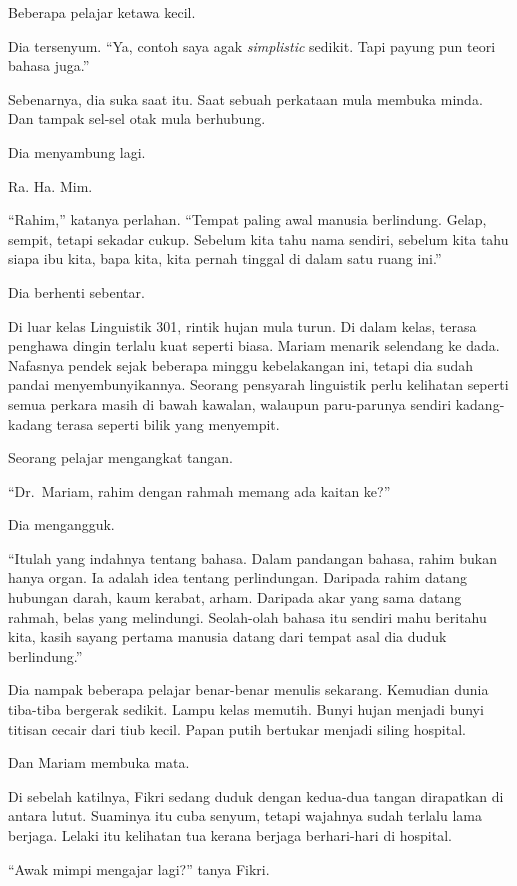 \documentclass[
  11pt,
  a5paper,
  openany,
  oneside]{book}
\begin{document}
Beberapa pelajar ketawa kecil.

Dia tersenyum. ``Ya, contoh saya agak \emph{simplistic} sedikit. Tapi
payung pun teori bahasa juga.''

Sebenarnya, dia suka saat itu. Saat sebuah perkataan mula membuka minda.
Dan tampak sel-sel otak mula berhubung.

Dia menyambung lagi.

Ra. Ha. Mim.

``Rahim,'' katanya perlahan. ``Tempat paling awal manusia berlindung.
Gelap, sempit, tetapi sekadar cukup. Sebelum kita tahu nama sendiri,
sebelum kita tahu siapa ibu kita, bapa kita, kita pernah tinggal di
dalam satu ruang ini.''

Dia berhenti sebentar.

Di luar kelas Linguistik 301, rintik hujan mula turun. Di dalam kelas,
terasa penghawa dingin terlalu kuat seperti biasa. Mariam menarik
selendang ke dada. Nafasnya pendek sejak beberapa minggu kebelakangan
ini, tetapi dia sudah pandai menyembunyikannya. Seorang pensyarah
linguistik perlu kelihatan seperti semua perkara masih di bawah kawalan,
walaupun paru-parunya sendiri kadang-kadang terasa seperti bilik yang
menyempit.

Seorang pelajar mengangkat tangan.

``Dr.~Mariam, rahim dengan rahmah memang ada kaitan ke?''

Dia mengangguk.

``Itulah yang indahnya tentang bahasa. Dalam pandangan bahasa, rahim
bukan hanya organ. Ia adalah idea tentang perlindungan. Daripada rahim
datang hubungan darah, kaum kerabat, arham. Daripada akar yang sama
datang rahmah, belas yang melindungi. Seolah-olah bahasa itu sendiri
mahu beritahu kita, kasih sayang pertama manusia datang dari tempat asal
dia duduk berlindung.''

Dia nampak beberapa pelajar benar-benar menulis sekarang. Kemudian dunia
tiba-tiba bergerak sedikit. Lampu kelas memutih. Bunyi hujan menjadi
bunyi titisan cecair dari tiub kecil. Papan putih bertukar menjadi
siling hospital.

Dan Mariam membuka mata.

Di sebelah katilnya, Fikri sedang duduk dengan kedua-dua tangan
dirapatkan di antara lutut. Suaminya itu cuba senyum, tetapi wajahnya
sudah terlalu lama berjaga. Lelaki itu kelihatan tua kerana berjaga
berhari-hari di hospital.

``Awak mimpi mengajar lagi?'' tanya Fikri.
\end{document}
